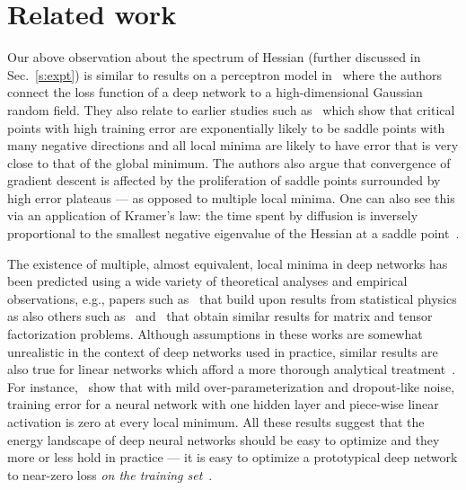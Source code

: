 \documentclass[10pt]{article}
\begin{document}
\section{Related work}
\label{s:prior_work}

Our above observation about the spectrum of Hessian (further discussed in Sec.~\ref{s:expt}) is similar to results on a perceptron model in~\citet{dauphin2014identifying} where the authors connect the loss function of a deep network to a high-dimensional Gaussian random field. They also relate to earlier studies such as~\citet{Baldi:1989:NNP:70359.70362,Fyodorov2007,Bray2007} which show that critical points with high training error are exponentially likely to be saddle points with many negative directions and all local minima are likely to have error that is very close to that of the global minimum. The authors also argue that convergence of gradient descent is affected by the proliferation of saddle points surrounded by high error plateaus --- as opposed to multiple local minima. One can also see this via an application of Kramer's law: the time spent by diffusion is inversely proportional to the smallest negative eigenvalue of the Hessian at a saddle point~\citep{bovier2006metastability}.

The existence of multiple, almost equivalent, local minima in deep networks has been predicted using a wide variety of theoretical analyses and empirical observations, e.g., papers such as~\citet{spinglass2015,DBLP:conf/colt/ChoromanskaLA15,chaudhari2015trivializing} that build upon results from statistical physics as also others such as~\citet{haeffele2015global} and~\citet{janzamin2015beating} that obtain similar results for matrix and tensor factorization problems. Although assumptions in these works are somewhat unrealistic in the context of deep networks used in practice, similar results are also true for linear networks which afford a more thorough analytical treatment~\citep{DBLP:journals/corr/SaxeMG13}. For instance,~\citet{soudry2016no} show that with mild over-parameterization and dropout-like noise, training error for a neural network with one hidden layer and piece-wise linear activation is zero at every local minimum. All these results suggest that the energy landscape of deep neural networks should be easy to optimize and they more or less hold in practice --- it is easy to optimize a prototypical deep network to near-zero loss \emph{on the training set}~\citep{hardt2015train,DBLP:journals/corr/GoodfellowV14}.
\end{document}
